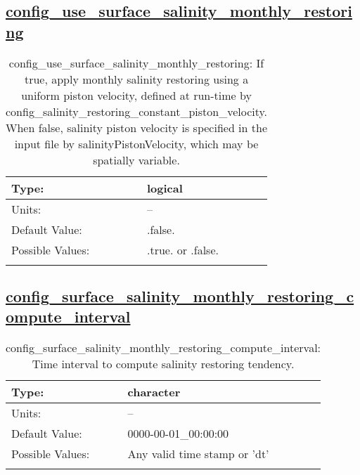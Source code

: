 \subsection[config\_use\_surface\_salinity\_monthly\_restoring]{\hyperref[sec:nm_tab_tracer_forcing_activeTracers]{config\_use\_surface\_salinity\_monthly\_restoring}}
\label{subsec:nm_sec_config_use_surface_salinity_monthly_restoring}
\begin{center}
\begin{longtable}{| p{2.0in} || p{4.0in} |}
    \hline
    Type: & logical \\
    \hline
    Units: & -- \\
    \hline
    Default Value: & .false. \\
    \hline
    Possible Values: & .true. or .false. \\
    \hline
    \caption{config\_use\_surface\_salinity\_monthly\_restoring: If true, apply monthly salinity restoring using a uniform piston velocity, defined at run-time by config\_salinity\_restoring\_constant\_piston\_velocity.  When false, salinity piston velocity is specified in the input file by salinityPistonVelocity, which may be spatially variable.}
\end{longtable}
\end{center}
\subsection[config\_surface\_salinity\_monthly\_restoring\_compute\_interval]{\hyperref[sec:nm_tab_tracer_forcing_activeTracers]{config\_surface\_salinity\_monthly\_restoring\_compute\_interval}}
\label{subsec:nm_sec_config_surface_salinity_monthly_restoring_compute_interval}
\begin{center}
\begin{longtable}{| p{2.0in} || p{4.0in} |}
    \hline
    Type: & character \\
    \hline
    Units: & -- \\
    \hline
    Default Value: & 0000-00-01\_00:00:00 \\
    \hline
    Possible Values: & Any valid time stamp or 'dt' \\
    \hline
    \caption{config\_surface\_salinity\_monthly\_restoring\_compute\_interval: Time interval to compute salinity restoring tendency.}
\end{longtable}
\end{center}
